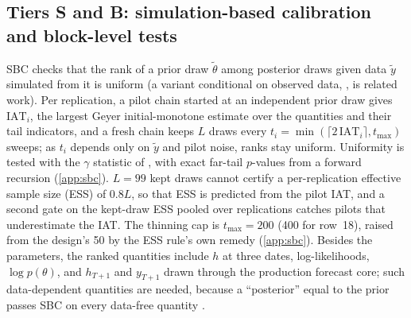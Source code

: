 \subsection{Tiers S and B: simulation-based calibration and block-level tests}\label{sec:validation-sbc}

SBC \citep{cook2006validation,gelman2017correction,talts2018validating,modrak2025simulation} checks
that the rank of a prior draw $\tilde\theta$ among posterior draws given data $\tilde y$ simulated
from it is uniform (a variant conditional on observed data, \citealp{sailynoja2025posterior}, is
related work). Per replication, a pilot chain started at an independent prior draw gives
$\mathrm{IAT}_i$, the largest Geyer initial-monotone estimate \citep{geyer1992practical} over the
quantities and their tail indicators, and a fresh chain keeps $L$ draws every
$t_i = \min(\lceil 2\,\mathrm{IAT}_i \rceil, t_{\max})$ sweeps; as $t_i$ depends only on $\tilde y$
and pilot noise, ranks stay uniform. %
Uniformity is tested with the $\gamma$ statistic of \citet{sailynoja2022graphical}, with exact
far-tail $p$-values from a forward recursion (\cref{app:sbc}). %
$L = 99$ kept draws cannot certify a per-replication effective sample size (ESS) of $0.8L$, so that
ESS is predicted from the pilot IAT, and a second gate on the kept-draw ESS pooled over
replications \citep{kish1965survey} catches pilots that underestimate the IAT. %
The thinning cap is $t_{\max} = 200$ (400 for row~18), raised from the design's 50 by the ESS
rule's own remedy (\cref{app:sbc}). %
Besides the parameters, the ranked quantities include $h$ at three dates, log-likelihoods,
$\log p(\theta)$, and $h_{T+1}$ and $y_{T+1}$ drawn through the production forecast core; such
data-dependent quantities are needed, because a ``posterior'' equal to the prior passes SBC on
every data-free quantity \citep[Section~3.4, Theorem~7]{modrak2025simulation}. %
